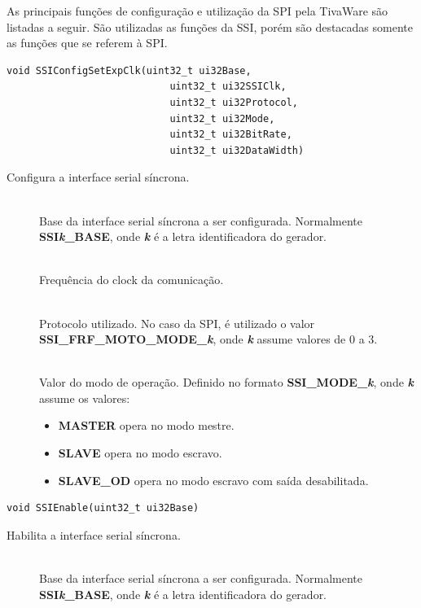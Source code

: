 As principais funções de configuração e utilização da SPI pela TivaWare são listadas a seguir. São utilizadas as funções da SSI, porém são destacadas somente as funções que se referem à SPI.

\begin{lstlisting}[style=funcao]
	void SSIConfigSetExpClk(uint32_t ui32Base,
							uint32_t ui32SSIClk,
							uint32_t ui32Protocol,
							uint32_t ui32Mode,
							uint32_t ui32BitRate,
							uint32_t ui32DataWidth)
\end{lstlisting}

Configura a interface serial síncrona.

\begin{description}
	\item []\hfill \\
	Base da interface serial síncrona a ser configurada. Normalmente \textbf{SSI\emph{k}\_BASE}, onde \textbf{\emph{k}} é a letra identificadora do gerador.
	
	\item []\hfill \\
	Frequência do clock da comunicação.
	
	\item []\hfill \\
	Protocolo utilizado. No caso da SPI, é utilizado o valor \textbf{SSI\_FRF\_MOTO\_MODE\_\emph{k}}, onde \textbf{\emph{k}} assume valores de 0 a 3.
	
	\item []\hfill \\
	Valor do modo de operação. Definido no formato \textbf{SSI\_MODE\_\emph{k}}, onde \textbf{\emph{k}} assume os valores:
	\begin{itemize}
		\item \textbf{MASTER} opera no modo mestre.
		\item \textbf{SLAVE} opera no modo escravo.
		\item \textbf{SLAVE\_OD} opera no modo escravo com saída desabilitada.
	\end{itemize}
\end{description}

\begin{lstlisting}[style=funcao]
	void SSIEnable(uint32_t ui32Base)
\end{lstlisting}

Habilita a interface serial síncrona.

\begin{description}
	\item []\hfill \\
	Base da interface serial síncrona a ser configurada. Normalmente \textbf{SSI\emph{k}\_BASE}, onde \textbf{\emph{k}} é a letra identificadora do gerador.
\end{description}


